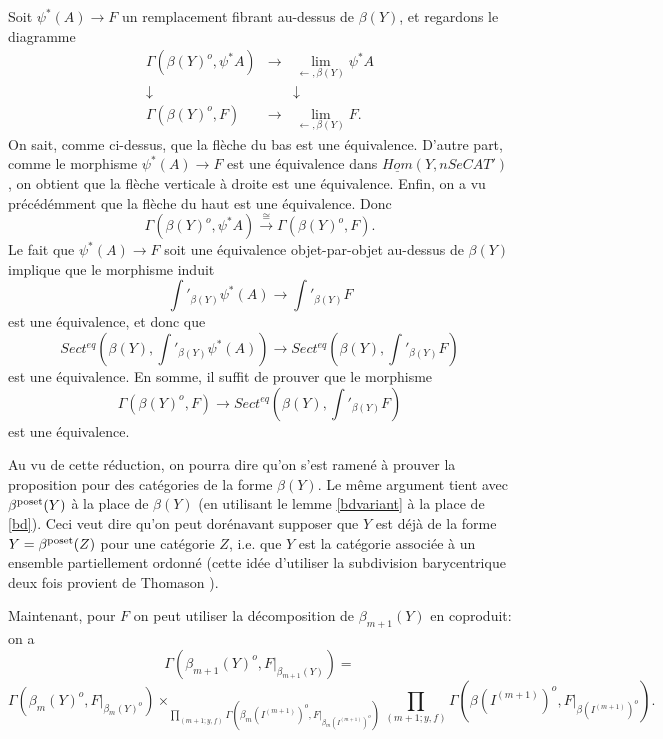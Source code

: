 \documentclass[12pt]{article}
\begin{document}
Soit $\psi ^{\ast} (A) \rightarrow F$ un remplacement fibrant au-dessus de
$\beta (Y)$, et regardons le diagramme
$$
\begin{array}{ccc}
\Gamma (\beta (Y)^o, \psi ^{\ast} A) &\rightarrow &
\lim _{\leftarrow , \beta (Y)} \psi ^{\ast}A \\
\downarrow && \downarrow \\
\Gamma (\beta (Y)^o, F)&\rightarrow &
\lim _{\leftarrow , \beta (Y)}F.
\end{array}
$$
On sait, comme ci-dessus, que la fl\`eche du bas est une \'equivalence.
D'autre part, comme le morphisme $\psi ^{\ast} (A) \rightarrow F$
est une \'equivalence dans $\underline{Hom}(Y, nSeCAT')$, on obtient que
la fl\`eche verticale \`a droite est une \'equivalence. Enfin, on a vu
pr\'ec\'ed\'emment que la fl\`eche du haut est une \'equivalence. Donc
$$
\Gamma (\beta (Y)^o, \psi ^{\ast} A)
\stackrel{\cong}{\rightarrow}
\Gamma (\beta (Y)^o, F).
$$
Le fait que $\psi ^{\ast} (A) \rightarrow F$ soit une \'equivalence
objet-par-objet au-dessus de $\beta (Y)$ implique que le morphisme induit
$$
\int '_{\beta (Y)}\psi ^{\ast}(A) \rightarrow
\int '_{\beta (Y)}F
$$
est une \'equivalence, et donc que
$$
Sect ^{eq}(\beta (Y), \int '_{\beta (Y)}\psi ^{\ast}(A) )
\rightarrow
Sect ^{eq}(\beta (Y), \int '_{\beta (Y)}F )
$$
est une \'equivalence. En somme, il suffit de prouver que le morphisme
$$
\Gamma (\beta (Y)^o, F)\rightarrow Sect ^{eq}(\beta (Y), \int '_{\beta (Y)}F )
$$
est une \'equivalence.

Au vu de cette r\'eduction, on pourra dire qu'on s'est ramen\'e \`a prouver la
proposition pour des cat\'egories de la forme $\beta (Y)$. Le m\^eme argument
tient avec $\beta^{\rm poset}(Y)$ \`a la place de $\beta (Y)$ (en utilisant le
lemme \ref{bdvariant} \`a la place de \ref{bd}). Ceci veut dire qu'on peut
dor\'enavant supposer que $Y$ est d\'ej\`a de la forme  $Y= \beta^{\rm
poset}(Z)$
pour une cat\'egorie $Z$, i.e. que $Y$ est la cat\'egorie associ\'ee \`a un
ensemble partiellement ordonn\'e (cette id\'ee d'utiliser la subdivision
barycentrique deux fois provient de Thomason \cite{ThomasonCatMod}).

Maintenant, pour $F$ on peut utiliser la d\'ecomposition de $\beta _{m+1}(Y)$ en
coproduit: on a
$$
\Gamma (\beta _{m+1}(Y)^o, F|_{\beta _{m+1}(Y)})=
$$
$$
\Gamma (\beta _m(Y)^o, F|_{\beta _{m}(Y)^o}) \times
_{\prod _{(m+1; y,f)}\Gamma (\beta _m(I^{(m+1)})^o, F|_{\beta
_{m}(I^{(m+1)})^o})}
\prod _{(m+1; y,f)}\Gamma (\beta (I^{(m+1)})^o, F|_{\beta (I^{(m+1)})^o}).
$$
\end{document}
